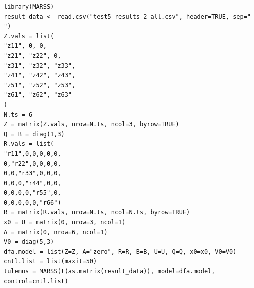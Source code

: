 \documentclass[a4paper,12pt]{report}
\begin{document}
\begin{verbatim}
library(MARSS)
result_data <- read.csv("test5_results_2_all.csv", header=TRUE, sep=" ")
Z.vals = list(
"z11", 0, 0,
"z21", "z22", 0,
"z31", "z32", "z33",
"z41", "z42", "z43",
"z51", "z52", "z53",
"z61", "z62", "z63"
)
N.ts = 6
Z = matrix(Z.vals, nrow=N.ts, ncol=3, byrow=TRUE)
Q = B = diag(1,3)
R.vals = list(
"r11",0,0,0,0,0,
0,"r22",0,0,0,0,
0,0,"r33",0,0,0,
0,0,0,"r44",0,0,
0,0,0,0,"r55",0,
0,0,0,0,0,"r66")
R = matrix(R.vals, nrow=N.ts, ncol=N.ts, byrow=TRUE)
x0 = U = matrix(0, nrow=3, ncol=1)
A = matrix(0, nrow=6, ncol=1)
V0 = diag(5,3)
dfa.model = list(Z=Z, A="zero", R=R, B=B, U=U, Q=Q, x0=x0, V0=V0)
cntl.list = list(maxit=50)
tulemus = MARSS(t(as.matrix(result_data)), model=dfa.model, control=cntl.list)
\end{verbatim}
\end{document}
